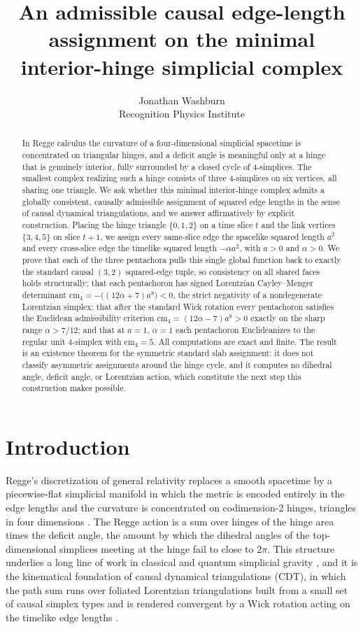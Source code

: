 \documentclass[11pt]{article}
\title{An admissible causal edge-length assignment on the minimal interior-hinge simplicial complex}
\author{Jonathan Washburn\\[2pt]
\small Recognition Physics Institute}
\date{}
\theoremstyle{definition}
\theoremstyle{remark}
\newcommand{\cm}{\mathrm{cm}_{4}}
\begin{document}
\maketitle

\begin{abstract}
In Regge calculus the curvature of a four-dimensional simplicial spacetime is concentrated on triangular hinges, and a deficit angle is meaningful only at a hinge that is genuinely interior, fully surrounded by a closed cycle of 4-simplices. The smallest complex realizing such a hinge consists of three 4-simplices on six vertices, all sharing one triangle. We ask whether this minimal interior-hinge complex admits a globally consistent, causally admissible assignment of squared edge lengths in the sense of causal dynamical triangulations, and we answer affirmatively by explicit construction. Placing the hinge triangle $\{0,1,2\}$ on a time slice $t$ and the link vertices $\{3,4,5\}$ on slice $t+1$, we assign every same-slice edge the spacelike squared length $a^{2}$ and every cross-slice edge the timelike squared length $-\alpha a^{2}$, with $a>0$ and $\alpha>0$. We prove that each of the three pentachora pulls this single global function back to exactly the standard causal $(3,2)$ squared-edge tuple, so consistency on all shared faces holds structurally; that each pentachoron has signed Lorentzian Cayley--Menger determinant $\cm=-\bigl((12\alpha+7)a^{8}\bigr)<0$, the strict negativity of a nondegenerate Lorentzian simplex; that after the standard Wick rotation every pentachoron satisfies the Euclidean admissibility criterion $\cm=(12\alpha-7)a^{8}>0$ exactly on the sharp range $\alpha>7/12$; and that at $a=1$, $\alpha=1$ each pentachoron Euclideanizes to the regular unit 4-simplex with $\cm=5$. All computations are exact and finite. The result is an existence theorem for the symmetric standard slab assignment: it does not classify asymmetric assignments around the hinge cycle, and it computes no dihedral angle, deficit angle, or Lorentzian action, which constitute the next step this construction makes possible.
\end{abstract}

\section{Introduction}
\label{sec:intro}

Regge's discretization of general relativity replaces a smooth spacetime by a piecewise-flat simplicial manifold in which the metric is encoded entirely in the edge lengths and the curvature is concentrated on codimension-2 hinges, triangles in four dimensions \cite{Regge}. The Regge action is a sum over hinges of the hinge area times the deficit angle, the amount by which the dihedral angles of the top-dimensional simplices meeting at the hinge fail to close to $2\pi$. This structure underlies a long line of work in classical and quantum simplicial gravity \cite{ReggeWilliams,HartleSorkin}, and it is the kinematical foundation of causal dynamical triangulations (CDT), in which the path sum runs over foliated Lorentzian triangulations built from a small set of causal simplex types and is rendered convergent by a Wick rotation acting on the timelike edge lengths \cite{AJL,Loll}.
\end{document}
